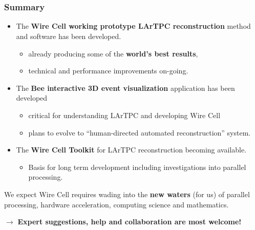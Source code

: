 

\section{}

\begin{frame}
  \frametitle{Summary}
  \footnotesize
  \begin{itemize}
  \item The \textbf{Wire Cell working prototype LArTPC reconstruction} method and software has been developed.
    \begin{itemize}  \footnotesize
    \item already producing some of the \textbf{world's best results},
    \item technical and performance improvements on-going.
    \end{itemize}
  \item The \textbf{Bee interactive 3D event visualization} 
    application has been developed
    \begin{itemize}
    \item critical for understanding LArTPC and developing Wire Cell
    \item plans to evolve to ``human-directed automated reconstruction'' system.
    \end{itemize}
  \item The \textbf{Wire Cell Toolkit} for LArTPC reconstruction
    becoming available.
    \begin{itemize}
    \item Basis for long term development including investigations
      into parallel processing.
    \end{itemize}
  \end{itemize}

  \begin{center}

    We expect Wire Cell requires wading into the \textbf{new waters}
    (for us) of parallel processing, hardware acceleration, computing
    science and mathematics.

    $\rightarrow$ \textbf{Expert suggestions, help and collaboration are
      most welcome!}
  \end{center}
\end{frame}


